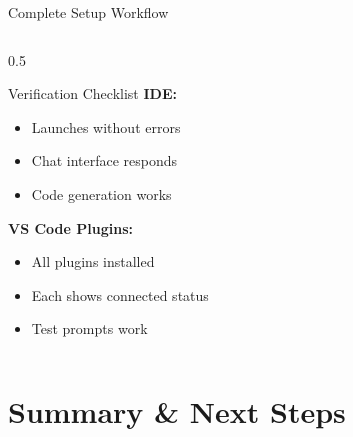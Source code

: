 \documentclass[aspectratio=169,11pt]{beamer}
\begin{document}
\begin{frame}{Complete Setup Workflow}
\begin{columns}[T]
\begin{column}{0.5\textwidth}
\begin{exampleblock}{Verification Checklist}
                \textbf{IDE:}
                \begin{itemize}
                    \item[$\square$] Launches without errors
                    \item[$\square$] Chat interface responds
                    \item[$\square$] Code generation works
                \end{itemize}

                \textbf{VS Code Plugins:}
                \begin{itemize}
                    \item[$\square$] All plugins installed
                    \item[$\square$] Each shows connected status
                    \item[$\square$] Test prompts work
                \end{itemize}
            \end{exampleblock}
        \end{column}
    \end{columns}

\end{frame}

\section{Summary \& Next Steps}
\end{document}
